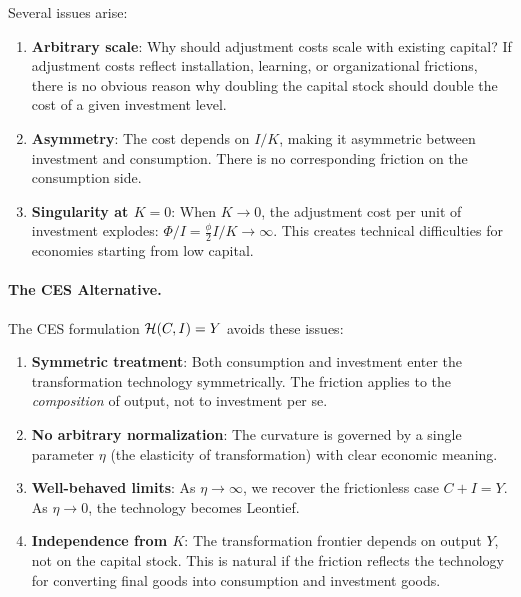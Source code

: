 Several issues arise:
\begin{enumerate}[label=(\roman*), nosep]
\item \textbf{Arbitrary scale}: Why should adjustment costs scale with existing capital? If adjustment costs reflect installation, learning, or organizational frictions, there is no obvious reason why doubling the capital stock should double the cost of a given investment level.

\item \textbf{Asymmetry}: The cost depends on $I/K$, making it asymmetric between investment and consumption. There is no corresponding friction on the consumption side.

\item \textbf{Singularity at $K = 0$}: When $K \to 0$, the adjustment cost per unit of investment explodes: $\Phi/I = \frac{\phi}{2} I/K \to \infty$. This creates technical difficulties for economies starting from low capital.
\end{enumerate}

\paragraph{The CES Alternative.}
The CES formulation $\mathcal{H}(C, I) = Y$ avoids these issues:
\begin{enumerate}[label=(\roman*), nosep]
\item \textbf{Symmetric treatment}: Both consumption and investment enter the transformation technology symmetrically. The friction applies to the \emph{composition} of output, not to investment per se.

\item \textbf{No arbitrary normalization}: The curvature is governed by a single parameter $\eta$ (the elasticity of transformation) with clear economic meaning.

\item \textbf{Well-behaved limits}: As $\eta \to \infty$, we recover the frictionless case $C + I = Y$. As $\eta \to 0$, the technology becomes Leontief.

\item \textbf{Independence from $K$}: The transformation frontier depends on output $Y$, not on the capital stock. This is natural if the friction reflects the technology for converting final goods into consumption and investment goods.
\end{enumerate}

